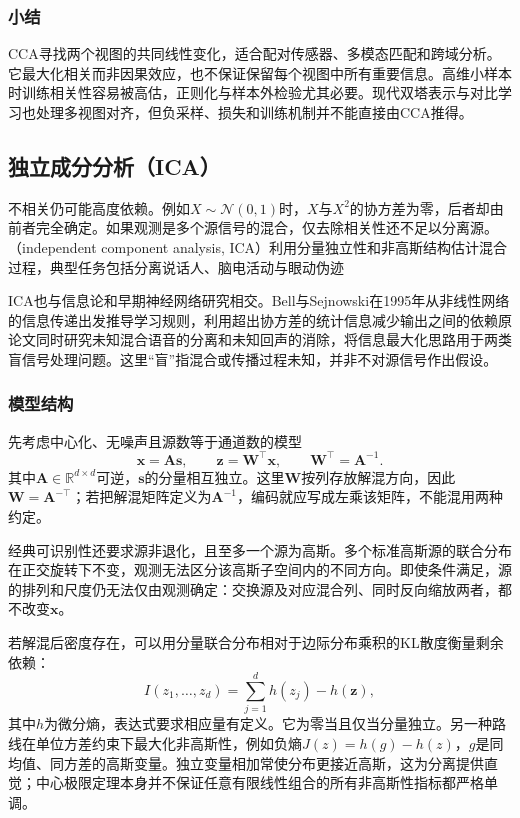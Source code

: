 \subsubsection{小结}
\label{sec:dim-cca-summary}

CCA寻找两个视图的共同线性变化，适合配对传感器、多模态匹配和跨域分析。它最大化相关而非因果效应，也不保证保留每个视图中所有重要信息。高维小样本时训练相关性容易被高估，正则化与样本外检验尤其必要。现代双塔表示与对比学习也处理多视图对齐，但负采样、损失和训练机制并不能直接由CCA推得。

\subsection{独立成分分析（ICA）}
\label{sec:dim-ica}

不相关仍可能高度依赖。例如$X\sim\mathcal{N}(0,1)$时，$X$与$X^2$的协方差为零，后者却由前者完全确定。如果观测是多个源信号的混合，仅去除相关性还不足以分离源。（independent component analysis, ICA）利用分量独立性和非高斯结构估计混合过程，典型任务包括分离说话人、脑电活动与眼动伪迹

ICA也与信息论和早期神经网络研究相交。Bell与Sejnowski在1995年从非线性网络的信息传递出发推导学习规则，利用超出协方差的统计信息减少输出之间的依赖原论文同时研究未知混合语音的分离和未知回声的消除，将信息最大化思路用于两类盲信号处理问题。这里“盲”指混合或传播过程未知，并非不对源信号作出假设。

\subsubsection{模型结构}
\label{sec:dim-ica-structure}

先考虑中心化、无噪声且源数等于通道数的模型
\begin{equation}
  \bm{x}=\bm{A}\bm{s},\qquad
  \bm{z}=\bm{W}^{\top}\bm{x},\qquad
  \bm{W}^{\top}=\bm{A}^{-1}.
  \label{eq:dim-ica-model}
\end{equation}
其中$\bm{A}\in\mathbb{R}^{d\times d}$可逆，$\bm{s}$的分量相互独立。这里$\bm{W}$按列存放解混方向，因此$\bm{W}=\bm{A}^{-\top}$；若把解混矩阵定义为$\bm{A}^{-1}$，编码就应写成左乘该矩阵，不能混用两种约定。

经典可识别性还要求源非退化，且至多一个源为高斯。多个标准高斯源的联合分布在正交旋转下不变，观测无法区分该高斯子空间内的不同方向。即使条件满足，源的排列和尺度仍无法仅由观测确定：交换源及对应混合列、同时反向缩放两者，都不改变$\bm{x}$。

若解混后密度存在，可以用分量联合分布相对于边际分布乘积的KL散度衡量剩余依赖：
\[
  I(z_1,\ldots,z_d)
  =\sum_{j=1}^{d}h(z_j)-h(\bm{z}),
\]
其中$h$为微分熵，表达式要求相应量有定义。它为零当且仅当分量独立。另一种路线在单位方差约束下最大化非高斯性，例如负熵$J(z)=h(g)-h(z)$，$g$是同均值、同方差的高斯变量。独立变量相加常使分布更接近高斯，这为分离提供直觉；中心极限定理本身并不保证任意有限线性组合的所有非高斯性指标都严格单调。

